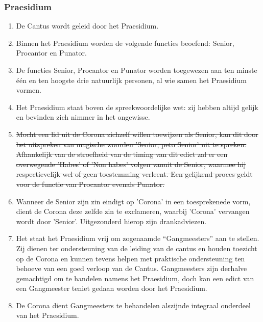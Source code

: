 \subsubsection*{Praesidium}
\footnotesize

\begin{enumerate}
    \item De Cantus wordt geleid door het Praesidium.
    \item Binnen het Praesidium worden de volgende functies beoefend: Senior, Procantor en Punator.
    \item De functies Senior, Procantor en Punator worden toegewezen aan ten minste één en ten hoogste drie natuurlijk personen, al wie samen het Praesidium vormen.
    \item Het Praesidium staat boven de spreekwoordelijke wet: zij hebben altijd gelijk en bevinden zich nimmer in het ongewisse. 
    \item \sout{Mocht een lid uit de Corona zichzelf willen toewijzen als Senior, kan dit door het uitspreken van magische woorden 'Senior, peto Senior' uit te spreken. Afhankelijk van de stroefheid van de timing van dit edict zal er een overwegende 'Habes' of 'Non habes' volgen vanuit de Senior, waarmee hij respectievelijk wel of geen toestemming verleent. Een gelijkend proces geldt voor de functie van Procantor evenals Punator.} 
    \item Wanneer de Senior zijn zin eindigt op 'Corona' in een toesprekenede vorm, dient de Corona deze zelfde zin te exclameren, waarbij 'Corona' vervangen wordt door 'Senior'. Uitgezonderd hierop zijn drankadviezen.
    \item Het staat het Praesidium vrij om zogenaamde ``Gangmeesters'' aan te stellen. Zij dienen ter ondersteuning van de leiding van de cantus en houden toezicht op de Corona en kunnen tevens helpen met praktische ondersteuning ten behoeve van een goed verloop van de Cantus. Gangmeesters zijn derhalve gemachtigd om te handelen namens het Praesidium, doch kan een edict van een Gangmeester teniet gedaan worden door het Praesidium.
    \item De Corona dient Gangmeesters te behandelen alszijnde integraal onderdeel van het Praesidium. 
\end{enumerate}


